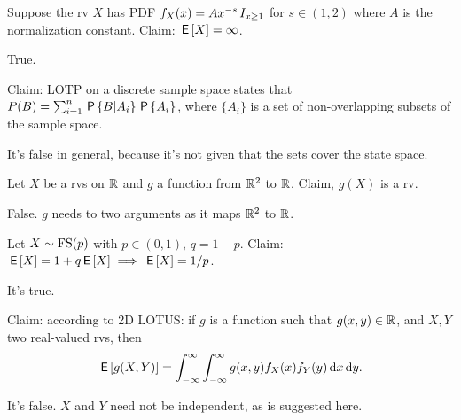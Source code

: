 \documentclass[tf-tutorial-all.tex]{subfiles}
\begin{document}
\begin{truefalse}
Suppose the rv $X$ has PDF $f_{X}(x) = Ax^{-s} \1{x\geq 1}$ for $s\in (1, 2)$ where $A$ is the normalization constant.
Claim: $\E X = \infty$.
\begin{solution}
True.
\end{solution}
\end{truefalse}

\begin{truefalse}
Claim: LOTP on a discrete sample space states that $P(B) = \sum_{i=1}^{n} \P{B|A_{i}} \P{A_{i}}$, where $\{A_{i}\}$ is a set of non-overlapping subsets of the sample space.
\begin{solution}
It's false in general, because it's not given that the sets cover the state space.
\end{solution}
\end{truefalse}


\begin{truefalse}
Let $X$ be a rvs on $\R$ and $g$ a function from $\R^{2}$ to $\R$.
Claim, $g(X)$ is a rv.
\begin{solution}
False. $g$ needs to two arguments as it maps $\R^{2}$ to $\R$.
\end{solution}
\end{truefalse}





\begin{truefalse}
Let $X\sim \FS{p}$ with $p\in (0, 1)$, $q=1-p$. Claim: $\E X = 1+q\E X \implies \E X = 1/p$.
\begin{solution}
It's true.
\end{solution}
\end{truefalse}


\begin{truefalse}
Claim: according to 2D LOTUS: if $g$ is a function such that $g(x, y) \in \R $, and $X, Y$ two real-valued rvs, then
\begin{equation}
\E{g(X,Y)} = \int_{-\infty}^{\infty} \int_{-\infty} ^{\infty} g(x,y) f_{X}(x)f_Y(y) \d x \d y.
\end{equation}
\begin{solution}
It's false. $X$ and $Y$ need not be independent, as is suggested here.
\end{solution}
\end{truefalse}
\end{document}

